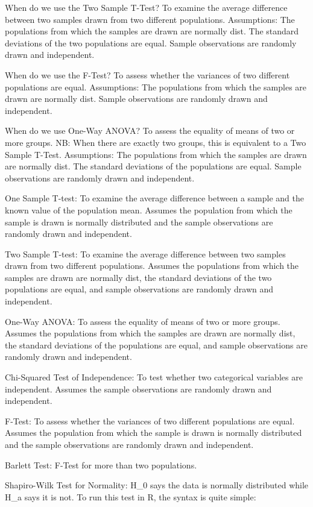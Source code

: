 \documentclass[]{book}
\begin{document}
When do we use the Two Sample T-Test? To examine the average difference between two samples drawn from two different populations. Assumptions: The populations from which the samples are drawn are normally dist. The standard deviations of the two populations are equal. Sample observations are randomly drawn and independent.

When do we use the F-Test? To assess whether the variances of two different populations are equal. Assumptions: The populations from which the samples are drawn are normally dist. Sample observations are randomly drawn and independent.

When do we use One-Way ANOVA? To assess the equality of means of two or more groups. NB: When there are exactly two groups, this is equivalent to a Two Sample T-Test. Assumptions: The populations from which the samples are drawn are normally dist. The standard deviations of the populations are equal. Sample observations are randomly drawn and independent.

One Sample T-test: To examine the average difference between a sample and the known value
of the population mean. Assumes the population from which the sample is drawn is normally distributed and the sample observations are randomly drawn and independent.

Two Sample T-test: To examine the average difference between two samples drawn from two
different populations. Assumes the populations from which the samples are drawn are normally dist, the standard deviations of the two populations are equal, and sample observations are randomly drawn and independent.

One-Way ANOVA: To assess the equality of means of two or more groups. Assumes the populations from which the samples are drawn are normally dist, the standard deviations of the populations are equal, and sample observations are randomly drawn and independent.

Chi-Squared Test of Independence: To test whether two categorical variables are independent. Assumes the sample observations are randomly drawn and independent.

F-Test: To assess whether the variances of two different populations are equal. Assumes the population from which the sample is drawn is normally distributed and the sample observations are randomly drawn and independent.

Barlett Test: F-Test for more than two populations.

Shapiro-Wilk Test for Normality: H\_0 says the data is normally distributed while H\_a says it is not. To run this test in R, the syntax is quite simple:
\end{document}
